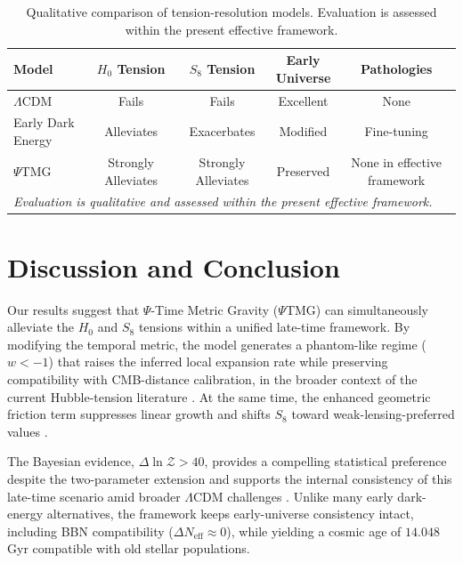 \documentclass[10pt,twocolumn,secnumarabic,amssymb, nobibnotes, aps, prd, floatfix]{revtex4-2}
\begin{document}
\begin{table}[!t]
\caption{Qualitative comparison of tension-resolution models. Evaluation is assessed within the present effective framework.}
\label{tab:model_comparison}
\small
\setlength{\tabcolsep}{8pt}
\renewcommand{\arraystretch}{1.4}
\begin{tabular}{lcccc}
Model & \shortstack{$H_0$\\Tension} & \shortstack{$S_8$\\Tension} & \shortstack{Early\\Universe} & Pathologies \\
\toprule
$\Lambda$CDM & Fails & Fails & Excellent & None \\
\midrule
Early Dark Energy & Alleviates & Exacerbates & Modified & Fine-tuning \\
$\Psi$TMG & Strongly Alleviates & Strongly Alleviates & Preserved & None in effective framework \\
\midrule
\multicolumn{5}{l}{\footnotesize \textit{Evaluation is qualitative and assessed within the present effective framework.}} \\
\bottomrule
\end{tabular}
\normalsize
\end{table}

\section{Discussion and Conclusion}

Our results suggest that $\Psi$-Time Metric Gravity ($\Psi$TMG) can simultaneously alleviate the $H_0$ and $S_8$ tensions within a unified late-time framework. By modifying the temporal metric, the model generates a phantom-like regime ($w < -1$) that raises the inferred local expansion rate while preserving compatibility with CMB-distance calibration, in the broader context of the current Hubble-tension literature \cite{DiValentino2021Tensions}. At the same time, the enhanced geometric friction term suppresses linear growth and shifts $S_8$ toward weak-lensing-preferred values \cite{Heymans2021KiDS,Abbott2022DES}.

The Bayesian evidence, $\Delta \ln \mathcal{Z} > 40$, provides a compelling statistical preference despite the two-parameter extension and supports the internal consistency of this late-time scenario amid broader $\Lambda$CDM challenges \cite{Perivolaropoulos2022Challenges}. Unlike many early dark-energy alternatives, the framework keeps early-universe consistency intact, including BBN compatibility ($\Delta N_{\text{eff}} \approx 0$), while yielding a cosmic age of $14.048$ Gyr compatible with old stellar populations.
\end{document}
